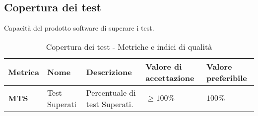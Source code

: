 \subsection{Copertura dei test}
Capacità del prodotto software di superare i test.
\begin{table}[H]
    \centering
    \begin{tabular}{|C{1.5cm}|L{3cm}|L{4cm}|L{2.5cm}|L{2.5cm}|}
        \hline
        \textbf{Metrica} & \textbf{Nome} & \textbf{Descrizione} & \textbf{Valore di accettazione} & \textbf{Valore preferibile} \\
        \hline
        \textbf{MTS} & Test Superati & Percentuale di test Superati. & $\geq 100\%$ & $100\%$ \\
        \hline
    \end{tabular}
    \caption{Copertura dei test - Metriche e indici di qualità}
    \label{tab:copertura_qualita_prodotto}
\end{table}